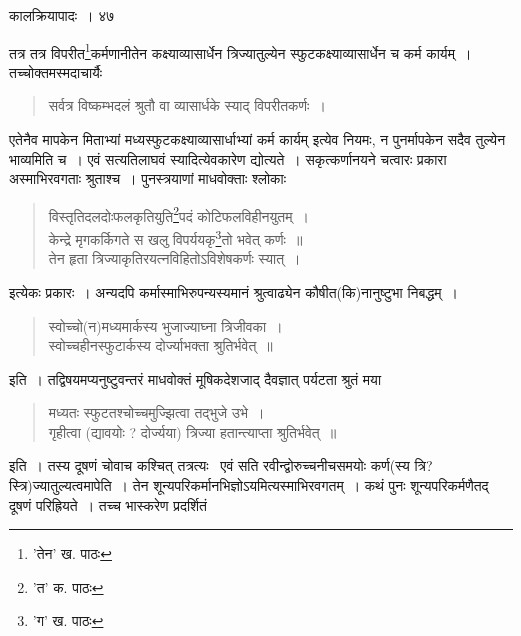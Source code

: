 \documentclass[11pt, openany]{book}
\begin{document}
{{{{{\newpage

\vspace{3cm} \hspace{4cm}कालक्रियापादः~।\hspace{4cm} ४७ 

\vspace{0.3cm}
\noindent तत्र तत्र विपरीत\renewcommand{\thefootnote}{१}\footnote{'तेन' ख. पाठः}कर्मणानीतेन कक्ष्याव्यासार्धेन त्रिज्यातुल्येन स्फुटकक्ष्याव्यासार्धेन च कर्म कार्यम्~। तच्चोक्तमस्मदाचार्यैः\textendash

\begin{quote}
{\qt सर्वत्र विष्कम्भदलं श्रुतौ वा व्यासार्धके स्याद् विपरीतकर्णः~।}
\end{quote}

\noindent एतेनैव मापकेन मिताभ्यां मध्यस्फुटकक्ष्याव्यासार्धाभ्यां कर्म कार्यम् इत्येव नियमः, न पुनर्मापकेन सदैव तुल्येन भाव्यमिति च~। एवं सत्यतिलाघवं स्यादित्येवकारेण द्योत्यते~। सकृत्कर्णानयने चत्वारः प्रकारा अस्माभिरवगताः श्रुताश्च~। पुनस्त्रयाणां माधवोक्ताः श्लोकाः\textendash 

\begin{quote}
{\qt विस्तृतिदलदोःफलकृतियुति\renewcommand{\thefootnote}{२}\footnote{'त' क. पाठः}पदं कोटिफलविहीनयुतम्~।
\\	
केन्द्रे मृगकर्किगते स खलु विपर्ययकृ\renewcommand{\thefootnote}{३}\footnote{'ग' ख. पाठः}तो भवेत् कर्णः~॥\\
तेन हृता त्रिज्याकृतिरयत्नविहितोऽविशेषकर्णः स्यात्~।}
\end{quote}

\noindent इत्येकः प्रकारः~। अन्यदपि कर्मास्माभिरुपन्यस्यमानं श्रुत्वाढ्येन कौषीत(कि)नानुष्टुभा निबद्धम्~। 

\begin{quote}
{\qt स्वोच्चो(न)मध्यमार्कस्य भुजाज्याघ्ना त्रिजीवका~।\\
स्वोच्चहीनस्फुटार्कस्य दोर्ज्याभक्ता श्रुतिर्भवेत्~॥}
\end{quote}

\noindent इति~। तद्विषयमप्यनुष्टुवन्तरं माधवोक्तं मूषिकदेशजाद् दैवज्ञात् पर्यटता श्रुतं मया\textendash

\begin{quote}
{\qt मध्यतः स्फुटतश्चोच्चमुज्झित्वा तद्भुजे उभे~।\\
गृहीत्वा (द्यावयोः ? दोर्ज्यया) त्रिज्या हतान्त्याप्ता श्रुतिर्भवेत्~॥}
\end{quote}

\noindent इति~। तस्य दूषणं चोवाच कश्चित् तत्रत्यः \textendash\ {\qt एवं सति रवीन्द्वोरुच्चनीचसमयोः कर्ण(स्य त्रि? स्त्रि)ज्यातुल्यत्वमापेति}~। तेन शून्यपरिकर्मानभिज्ञोऽयमित्यस्माभिरवगतम्~। कथं पुनः शून्यपरिकर्मणैतद् दूषणं परिह्रियते~। तच्च भास्करेण प्रदर्शितं \textendash
 
}}}}}
\end{document}
